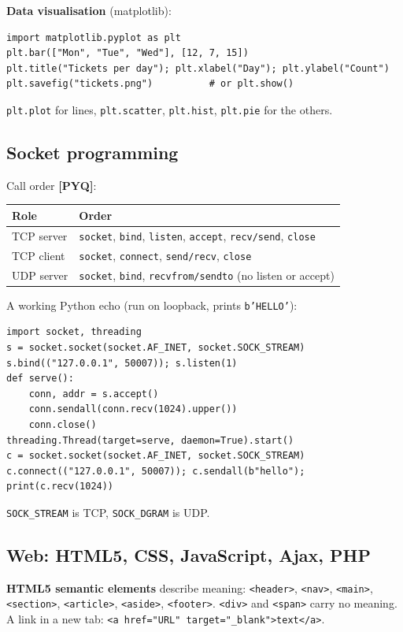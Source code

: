 \documentclass[11pt,a4paper]{article}
\newcommand{\pyq}{\textcolor{ember}{\scriptsize\textbf{[PYQ]}}}
\begin{document}
\textbf{Data visualisation} (matplotlib):

\begin{lstlisting}
import matplotlib.pyplot as plt
plt.bar(["Mon", "Tue", "Wed"], [12, 7, 15])
plt.title("Tickets per day"); plt.xlabel("Day"); plt.ylabel("Count")
plt.savefig("tickets.png")          # or plt.show()
\end{lstlisting}
\texttt{plt.plot} for lines, \texttt{plt.scatter}, \texttt{plt.hist}, \texttt{plt.pie} for the others.

\subsection{Socket programming}
Call order \pyq{}:

\begin{center}\small\renewcommand{\arraystretch}{1.18}\setlength{\tabcolsep}{9pt}
\begin{tabularx}{\linewidth}{@{}l>{\raggedright\arraybackslash}X@{}}
\toprule
\textbf{\color{slate}Role} & \textbf{\color{slate}Order} \\ \midrule
TCP server & \texttt{socket}, \texttt{bind}, \texttt{listen}, \texttt{accept}, \texttt{recv/send}, \texttt{close} \\
TCP client & \texttt{socket}, \texttt{connect}, \texttt{send/recv}, \texttt{close} \\
UDP server & \texttt{socket}, \texttt{bind}, \texttt{recvfrom/sendto} (no listen or accept) \\
\bottomrule
\end{tabularx}\end{center}
A working Python echo (run on loopback, prints \texttt{b'HELLO'}):

\begin{lstlisting}
import socket, threading
s = socket.socket(socket.AF_INET, socket.SOCK_STREAM)
s.bind(("127.0.0.1", 50007)); s.listen(1)
def serve():
    conn, addr = s.accept()
    conn.sendall(conn.recv(1024).upper())
    conn.close()
threading.Thread(target=serve, daemon=True).start()
c = socket.socket(socket.AF_INET, socket.SOCK_STREAM)
c.connect(("127.0.0.1", 50007)); c.sendall(b"hello"); print(c.recv(1024))
\end{lstlisting}
\texttt{SOCK\_STREAM} is TCP, \texttt{SOCK\_DGRAM} is UDP.

\subsection{Web: HTML5, CSS, JavaScript, Ajax, PHP}
\textbf{HTML5 semantic elements} describe meaning: \texttt{<header>}, \texttt{<nav>}, \texttt{<main>}, \texttt{<section>}, \texttt{<article>}, \texttt{<aside>}, \texttt{<footer>}. \texttt{<div>} and \texttt{<span>} carry no meaning. A link in a new tab: \texttt{<a href="URL" target="\_blank">text</a>}.
\end{document}
